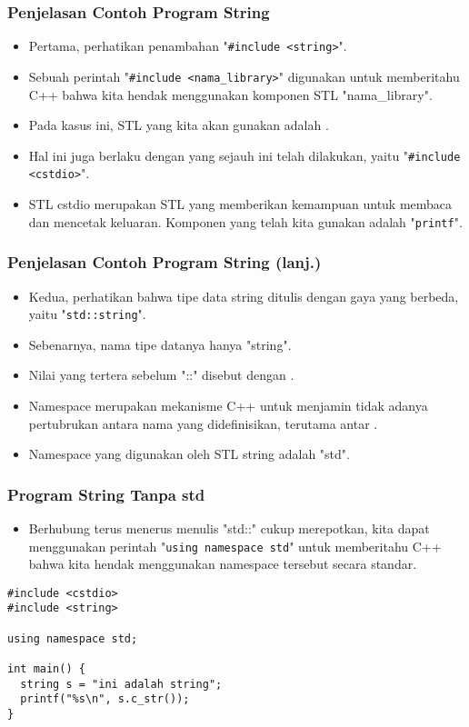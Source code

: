 \begin{frame}
\frametitle{Penjelasan Contoh Program String}
\begin{itemize}
  \item Pertama, perhatikan penambahan "\texttt{\#include <string>}".
  \item Sebuah perintah "\texttt{\#include <nama\_library>}" digunakan untuk memberitahu C++ bahwa kita hendak menggunakan komponen STL "nama\_library".
  \item Pada kasus ini, STL yang kita akan gunakan adalah .
  \item Hal ini juga berlaku dengan yang sejauh ini telah dilakukan, yaitu "\texttt{\#include <cstdio>}".
  \item STL cstdio merupakan STL yang memberikan kemampuan untuk membaca dan mencetak keluaran. Komponen yang telah kita gunakan adalah "\texttt{printf}".
\end{itemize}
\end{frame}

\begin{frame}
\frametitle{Penjelasan Contoh Program String (lanj.)}
\begin{itemize}
  \item Kedua, perhatikan bahwa tipe data string ditulis dengan gaya yang berbeda, yaitu "\texttt{std::string}".
  \item Sebenarnya, nama tipe datanya hanya "string".
  \item Nilai yang tertera sebelum "::" disebut dengan .
  \item Namespace merupakan mekanisme C++ untuk menjamin tidak adanya pertubrukan antara nama  yang didefinisikan, terutama antar .
  \item Namespace yang digunakan oleh STL string adalah "std".
\end{itemize}
\end{frame}

\begin{frame}[fragile]
\frametitle{Program String Tanpa std}
\begin{itemize}
  \item Berhubung terus menerus menulis "std::" cukup merepotkan, kita dapat menggunakan perintah "\texttt{using namespace std}" untuk memberitahu C++ bahwa kita hendak menggunakan namespace tersebut secara standar.
\end{itemize}
\begin{lstlisting}
#include <cstdio>
#include <string>

using namespace std;

int main() {
  string s = "ini adalah string";
  printf("%s\n", s.c_str());
}\end{lstlisting}
\end{frame}

